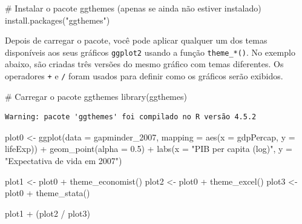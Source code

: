 \documentclass[
  portuguese,
  letterpaper,
  DIV=11,
  numbers=noendperiod]{scrreprt}
\newenvironment{Shaded}{\begin{snugshade}}{\end{snugshade}}
\newcommand{\AttributeTok}[1]{\textcolor[rgb]{0.40,0.45,0.13}{#1}}
\newcommand{\CommentTok}[1]{\textcolor[rgb]{0.37,0.37,0.37}{#1}}
\newcommand{\FloatTok}[1]{\textcolor[rgb]{0.68,0.00,0.00}{#1}}
\newcommand{\FunctionTok}[1]{\textcolor[rgb]{0.28,0.35,0.67}{#1}}
\newcommand{\NormalTok}[1]{\textcolor[rgb]{0.00,0.23,0.31}{#1}}
\newcommand{\OtherTok}[1]{\textcolor[rgb]{0.00,0.23,0.31}{#1}}
\newcommand{\SpecialCharTok}[1]{\textcolor[rgb]{0.37,0.37,0.37}{#1}}
\newcommand{\StringTok}[1]{\textcolor[rgb]{0.13,0.47,0.30}{#1}}
\theoremstyle{definition}
\theoremstyle{remark}
\begin{document}
\begin{Shaded}
\begin{Highlighting}[]
\CommentTok{\# Instalar o pacote ggthemes (apenas se ainda não estiver instalado)}
\FunctionTok{install.packages}\NormalTok{(}\StringTok{"ggthemes"}\NormalTok{)}
\end{Highlighting}
\end{Shaded}

Depois de carregar o pacote, você pode aplicar qualquer um dos temas
disponíveis aos seus gráficos \texttt{ggplot2} usando a função
\texttt{theme\_*()}. No exemplo abaixo, são criadas três versões do
mesmo gráfico com temas diferentes. Os operadores \texttt{+} e
\texttt{/} foram usados para definir como os gráficos serão exibidos.

\begin{Shaded}
\begin{Highlighting}[]
\CommentTok{\# Carregar o pacote ggthemes}
\FunctionTok{library}\NormalTok{(ggthemes)}
\end{Highlighting}
\end{Shaded}

\begin{verbatim}
Warning: pacote 'ggthemes' foi compilado no R versão 4.5.2
\end{verbatim}

\begin{Shaded}
\begin{Highlighting}[]
\NormalTok{plot0 }\OtherTok{\textless{}{-}} \FunctionTok{ggplot}\NormalTok{(}\AttributeTok{data =}\NormalTok{ gapminder\_2007, }
       \AttributeTok{mapping =} \FunctionTok{aes}\NormalTok{(}\AttributeTok{x =}\NormalTok{ gdpPercap, }\AttributeTok{y =}\NormalTok{ lifeExp)) }\SpecialCharTok{+}
  \FunctionTok{geom\_point}\NormalTok{(}\AttributeTok{alpha =} \FloatTok{0.5}\NormalTok{) }\SpecialCharTok{+}
  \FunctionTok{labs}\NormalTok{(}\AttributeTok{x =} \StringTok{"PIB per capita (log)"}\NormalTok{, }
       \AttributeTok{y =} \StringTok{"Expectativa de vida em 2007"}\NormalTok{)}

\NormalTok{plot1 }\OtherTok{\textless{}{-}}\NormalTok{ plot0 }\SpecialCharTok{+} \FunctionTok{theme\_economist}\NormalTok{()}
\NormalTok{plot2 }\OtherTok{\textless{}{-}}\NormalTok{ plot0 }\SpecialCharTok{+} \FunctionTok{theme\_excel}\NormalTok{()}
\NormalTok{plot3 }\OtherTok{\textless{}{-}}\NormalTok{ plot0 }\SpecialCharTok{+} \FunctionTok{theme\_stata}\NormalTok{()}

\NormalTok{plot1 }\SpecialCharTok{+}\NormalTok{  (plot2 }\SpecialCharTok{/}\NormalTok{ plot3)}
\end{Highlighting}
\end{Shaded}
\end{document}
